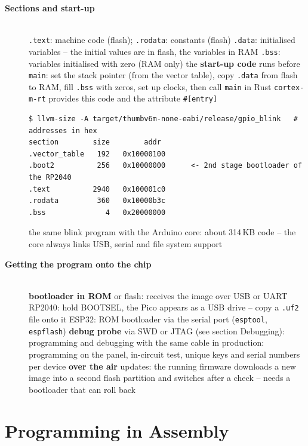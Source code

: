 \begin{description}
\item[{\rot\bf Sections and start-up}]~\\[-\lblskip]
\bi
	\ite \texttt{.text}: machine code (flash); \texttt{.rodata}: constants (flash)
	\ite \texttt{.data}: initialised variables -- the initial values are in flash, the variables in RAM
	\ite \texttt{.bss}: variables initialised with zero (RAM only)
	\ite the \textbf{start-up code} runs before \texttt{main}: set the stack pointer (from the vector table), copy \texttt{.data} from flash to RAM, fill \texttt{.bss} with zeros, set up clocks, then call \texttt{main}
	\ite in Rust \texttt{cortex-m-rt} provides this code and the attribute \texttt{\#[entry]}
\ei
\begin{lstlisting}[language={}]
$ llvm-size -A target/thumbv6m-none-eabi/release/gpio_blink   # addresses in hex
section        size        addr
.vector_table   192   0x10000100
.boot2          256   0x10000000      <- 2nd stage bootloader of the RP2040
.text          2940   0x100001c0
.rodata         360   0x10000b3c
.bss              4   0x20000000
\end{lstlisting}
\bi
	\ite the same blink program with the Arduino core: about 314\,KB code -- the core always links USB, serial and file system support
\ei
\os{\newpage}

\item[{\rot\bf Getting the program onto the chip}]~\\[-\lblskip]
\bi
	\ite \textbf{bootloader in ROM} or flash: receives the image over USB or UART
	\bi
		\ite RP2040: hold BOOTSEL, the Pico appears as a USB drive -- copy a \texttt{.uf2} file onto it
		\ite ESP32: ROM bootloader via the serial port (\texttt{esptool}, \texttt{espflash})
	\ei
	\ite \textbf{debug probe} via SWD or JTAG (see section Debugging): programming and debugging with the same cable
	\ite in production: programming on the panel, in-circuit test, unique keys and serial numbers per device
	\ite \textbf{over the air} updates: the running firmware downloads a new image into a second flash partition and switches after a check -- needs a bootloader that can roll back
\ei
\os{\newpage}
\end{description}

\section{Programming in Assembly}

